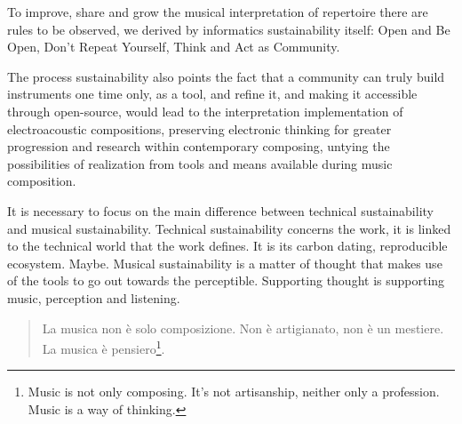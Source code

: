 \documentclass[twoside,a4paper]{article}
\begin{document}
To improve, share and grow the musical interpretation of repertoire there are rules to be observed, we derived by informatics sustainability itself: Open and Be Open, Don't Repeat Yourself, Think and Act as Community.

The process sustainability also points the fact that a community can truly build instruments one time only, as a tool, and refine it, and making it accessible through open-source, would lead to the interpretation implementation of electroacoustic compositions, preserving electronic thinking for greater progression and research within contemporary composing, untying the possibilities of realization from tools and means available during music composition.

It is necessary to focus on the main difference between technical sustainability and musical sustainability. Technical sustainability concerns the work, it is linked to the technical world that the work defines. It is its carbon dating, reproducible ecosystem. Maybe. Musical sustainability is a matter of thought that makes use of the tools to go out towards the perceptible. Supporting thought is supporting music, perception and listening.

\begin{quote}
La musica non è solo composizione. Non è artigianato, non è un mestiere. La musica è pensiero\cite{nono85}\footnote{Music is not only composing. It’s not artisanship, neither only a profession. Music is a way of thinking.}.
\end{quote}
%

\nocite{*}

%
%
%
\end{document}

